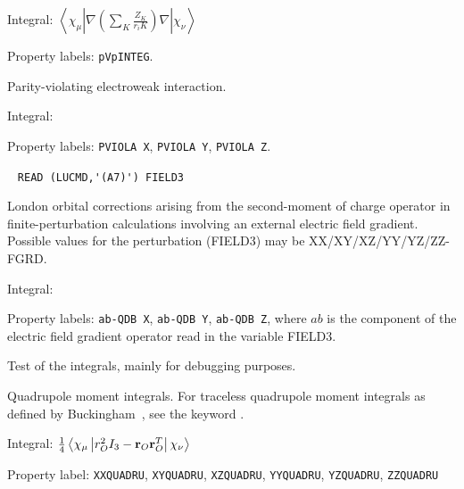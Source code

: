 \begin{description}
\begin{list}{}{}
\item Integral:
$\left<\chi_{\mu}\left|\nabla\left(\sum_K\frac{Z_K}{r_iK}\right)\nabla\right|\chi_{\nu}\right>$ 
\item Property labels: \verb|pVpINTEG|.
\end{list}

\item[\Key{PVIOLA}] Parity-violating electroweak interaction.

\begin{list}{}{}
\item Integral:
\item Property labels: \verb|PVIOLA X|, \verb|PVIOLA Y|, \verb|PVIOLA Z|.
\end{list}

\item[\Key{QDBINT}]\verb| |\newline
\verb|READ (LUCMD,'(A7)') FIELD3|

London orbital corrections arising from the second-moment of charge
operator in finite-perturbation calculations involving an external
electric field gradient. Possible values for the perturbation (FIELD3)
may be XX/XY/XZ/YY/YZ/ZZ-FGRD.

\begin{list}{}{}
\item Integral: 
\item Property labels: \verb|ab-QDB X|, \verb|ab-QDB Y|,
  \verb|ab-QDB Z|, where $ab$ is the component of the electric field
  gradient operator read in the variable FIELD3.
\end{list}

\item[\Key{QDBTST}] Test of the  integrals, mainly for
  debugging purposes.

\item[\Key{QUADRU}] Quadrupole moment integrals.
For traceless quadrupole moment integrals as
defined by Buckingham~\cite{adbacp12}, see the keyword .

\begin{list}{}{}
\item Integral: $\frac{1}{4}\left<\chi_{\mu}\left|
r^{2}_{O}I_3 - {\bf r}_{O}{\bf r}_{O}^{T}
\right|\chi_{\nu}\right>$
\item Property label: \verb|XXQUADRU|, \verb|XYQUADRU|,
\verb|XZQUADRU|, \verb|YYQUADRU|, \verb|YZQUADRU|, \verb|ZZQUADRU|
\end{list}


\end{description}
